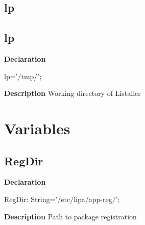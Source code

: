 \documentclass{report}
\newif\ifpdf
\begin{document}
\subsection*{\large{\textbf{lp}}\normalsize\hspace{1ex}\hrulefill}
\else
\subsection*{lp}
\fi
\label{ipkhandle-lp}
\begin{list}{}{
\setlength{\itemindent}{0cm}
\setlength{\listparindent}{0cm}
\setlength{\leftmargin}{\evensidemargin}
\addtolength{\leftmargin}{\tmplength}
\settowidth{\labelsep}{X}
\addtolength{\leftmargin}{\labelsep}
\setlength{\labelwidth}{\tmplength}
}
\item[\textbf{Declaration}\hfill]
\ifpdf
\begin{flushleft}
\fi
\begin{ttfamily}
lp='/tmp/';\end{ttfamily}

\ifpdf
\end{flushleft}
\fi

\par
\item[\textbf{Description}]
Working directory of Listaller

\end{list}
\section{Variables}
\ifpdf
\subsection*{\large{\textbf{RegDir}}\normalsize\hspace{1ex}\hrulefill}
\else
\subsection*{RegDir}
\fi
\label{ipkhandle-RegDir}
\begin{list}{}{
\setlength{\itemindent}{0cm}
\setlength{\listparindent}{0cm}
\setlength{\leftmargin}{\evensidemargin}
\addtolength{\leftmargin}{\tmplength}
\settowidth{\labelsep}{X}
\addtolength{\leftmargin}{\labelsep}
\setlength{\labelwidth}{\tmplength}
}
\item[\textbf{Declaration}\hfill]
\ifpdf
\begin{flushleft}
\fi
\begin{ttfamily}
RegDir: String='/etc/lipa/app-reg/';\end{ttfamily}

\ifpdf
\end{flushleft}
\fi

\par
\item[\textbf{Description}]
Path to package registration

\end{list}
\ifpdf
\end{document}

